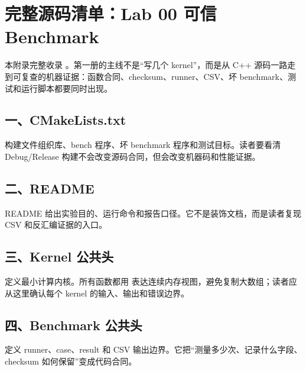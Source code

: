 \chapter{完整源码清单：Lab 00 可信 Benchmark}

本附录完整收录 。第一册的主线不是“写几个 kernel”，而是从 C++ 源码一路走到可复查的机器证据：函数合同、checksum、runner、CSV、坏 benchmark、测试和运行脚本都要同时出现。

\section{一、CMakeLists.txt}

构建文件组织库、bench 程序、坏 benchmark 程序和测试目标。读者要看清 Debug/Release 构建不会改变源码合同，但会改变机器码和性能证据。



\section{二、README}

README 给出实验目的、运行命令和报告口径。它不是装饰文档，而是读者复现 CSV 和反汇编证据的入口。



\section{三、Kernel 公共头}

 定义最小计算内核。所有函数都用  表达连续内存视图，避免复制大数组；读者应从这里确认每个 kernel 的输入、输出和错误边界。



\section{四、Benchmark 公共头}

 定义 runner、case、result 和 CSV 输出边界。它把“测量多少次、记录什么字段、checksum 如何保留”变成代码合同。

